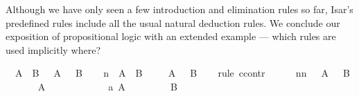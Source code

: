 \begin{isabellebody}
\begin{isamarkuptext}
Although we have only seen a few introduction and elimination rules so
far, Isar's predefined rules include all the usual natural deduction
rules. We conclude our exposition of propositional logic with an extended
example --- which rules are used implicitly where?%
\end{isamarkuptext}%
\isamarkuptrue%
\isamarkupfalse%
\ {}{}\ {}A\ {}\ B{}\ {}\ {}\ A\ {}\ {}\ B{}\isanewline
%
\isadelimproof
%
\endisadelimproof
%
\isatagproof
{}\isamarkupfalse%
\isanewline
\ \ \isamarkupfalse%
\ n{}\ {}{}\ {}A\ {}\ B{}{}\isanewline
\ \ \isamarkupfalse%
\ {}{}\ A\ {}\ {}\ B{}\isanewline
\ \ \isamarkupfalse%
\ {}rule\ ccontr{}\isanewline
\ \ \ \ \isamarkupfalse%
\ nn{}\ {}{}\ {}{}\ A\ {}\ {}\ B{}{}\isanewline
\ \ \ \ \isamarkupfalse%
\ {}{}\ A{}\isanewline
\ \ \ \ \isamarkupfalse%
\isanewline
\ \ \ \ \ \ \isamarkupfalse%
\ a{}\ {}A{}\isanewline
\ \ \ \ \ \ \isamarkupfalse%
\ {}{}\ B{}\isanewline

\end{isabellebody}
